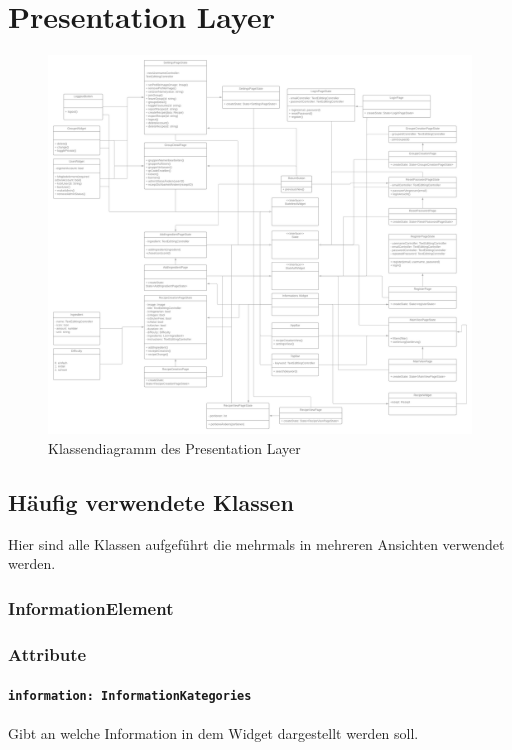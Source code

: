 \documentclass[parskip=full]{scrartcl}
\begin{document}
\section{Presentation Layer}
\begin{figure}[htp]
    \centering
    \includegraphics[width = \textwidth]{images/presentationLayer/presentationLayer.png}
    \caption{Klassendiagramm des Presentation Layer}
    \label{fig:presentation-layer}
\end{figure}

\newpage

\subsection{Häufig verwendete Klassen}
    Hier sind alle Klassen aufgeführt die mehrmals in mehreren Ansichten verwendet werden.

    \subsubsection{InformationElement} \label{sec:InformationElement}
        \subsubsection*{Attribute}
            \paragraph*{\texttt{information: InformationKategories}} Gibt an welche Information in dem Widget dargestellt werden soll.
\end{document}
